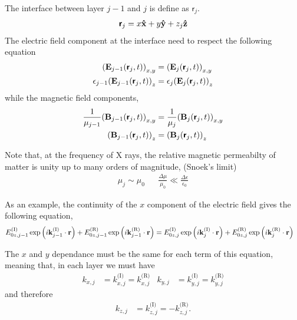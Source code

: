 The interface between layer $j-1$ and $j$ is define as $\boldsymbol{\mathsf{r}}_j$.
\begin{align*}
	\boldsymbol{\mathsf{r}}_j = x\vu{x} + y\vu{y} + z_j\vu{z}
\end{align*}
The electric field component at the interface need to respect the following equation
\begin{align*}
	\pqty{\vb{E}_{j-1}\pqty{\boldsymbol{\mathsf{r}}_j,t}}_{x,y}           & = \pqty{\vb{E}_{j}\pqty{\boldsymbol{\mathsf{r}}_j,t}}_{x,y}         \\
	\epsilon_{j-1}\pqty{\vb{E}_{j-1}\pqty{\boldsymbol{\mathsf{r}}_j,t}}_z & = \epsilon_{j}\pqty{\vb{E}_{j}\pqty{\boldsymbol{\mathsf{r}}_j,t}}_z
\end{align*} while the magnetic field components,
\begin{align*}
	\frac{1}{\mu_{j-1}}\pqty{\vb{B}_{j-1}\pqty{\boldsymbol{\mathsf{r}}_j,t}}_{x,y} & = \frac{1}{\mu_j}\pqty{\vb{B}_{j}\pqty{\boldsymbol{\mathsf{r}}_j,t}}_{x,y} \\
	\pqty{\vb{B}_{j-1}\pqty{\boldsymbol{\mathsf{r}}_j,t}}_z                        & = \pqty{\vb{B}_{j}\pqty{\boldsymbol{\mathsf{r}}_j,t}}_z
\end{align*}

Note that, at the frequency of X rays, the relative magnetic permeabilty of matter is unity up to many orders of magnitude, (Snoek's limit)
\begin{align*}
	\mu_j \sim \mu_0 &  & \frac{\Delta \mu}{\mu_0} \ll \frac{\Delta \epsilon}{\epsilon_0}
\end{align*}

As an example, the continuity of the $x$ component of the electric field gives the following equation,
\begin{align*}
	E_{0z,{j-1}}^{(\text{I})}\exp\pqty{i\vb{k}_{j-1}^{(\text{I})}\cdot\vb{r}} +
	E_{0z,{j-1}}^{(\text{R})}\exp\pqty{i\vb{k}_{j-1}^{(\text{R})}\cdot\vb{r}}
	 & =
	E_{0z,j}^{(\text{I})}\exp\pqty{i\vb{k}_j^{(\text{I})}\cdot\vb{r}} +
	E_{0z,j}^{(\text{R})}\exp\pqty{i\vb{k}_j^{(\text{R})}\cdot\vb{r}}
\end{align*}


The $x$ and $y$ dependance must be the same for each term of this equation, meaning that, in each layer we must have
\begin{align*}
	k_{x,j} & = k^{\text{(I)}}_{x,j} = k^{\text{(R)}}_{x,j} & k_{y,j} & = k^{\text{(I)}}_{y,j} = k^{\text{(R)}}_{y,j}
\end{align*} and therefore
\begin{align*}
	k_{z,j} & = k^{\text{(I)}}_{z,j} = -k^{\text{(R)}}_{z,j}.
\end{align*}


